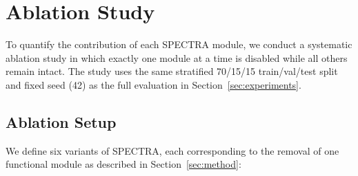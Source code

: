 
\section{Ablation Study}
\label{sec:ablation}

To quantify the contribution of each SPECTRA module, we conduct a systematic
ablation study in which exactly one module at a time is disabled while all
others remain intact.
The study uses the same stratified 70/15/15 train/val/test split and fixed
seed (42) as the full evaluation in Section~\ref{sec:experiments}.


\subsection{Ablation Setup}
\label{subsec:ablation_setup}

We define six variants of SPECTRA, each corresponding to the removal of one
functional module as described in Section~\ref{sec:method}:


